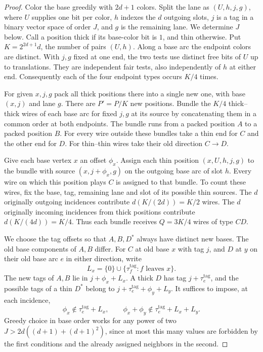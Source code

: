 \begin{proof}
Color the base greedily with $2d+1$ colors. Split the lane as $(U,h,j,g)$,
where $U$ supplies one bit per color, $h$ indexes the $d$ outgoing slots,
$j$ is a tag in a binary vector space of order $J$, and $g$ is the remaining
lane. We determine $J$ below. Call a position thick if its base-color bit
is $1$, and thin otherwise. Put $K=2^{2d+1}d$, the number of pairs $(U,h)$.
Along a base arc the endpoint colors are distinct. With $j,g$ fixed at one
end, the two tests use distinct free bits of $U$ up to translations. They
are independent fair tests, also independently of $h$ at either end.
Consequently each of the four endpoint types occurs $K/4$ times.

For given $x,j,g$ pack all thick positions there into a single new one, with
base $(x,j)$ and lane $g$. There are $P'=P/K$ new positions. Bundle the
$K/4$ thick--thick wires of each base arc for fixed $j,g$ at its source by
concatenating them in a common order at both endpoints. The bundle runs from
a packed position $A$ to a packed position $B$. For every wire outside these
bundles take a thin end for $C$ and the other end for $D$. For thin--thin
wires take their old direction $C\to D$.

Give each base vertex $x$ an offset $\phi_x$. Assign each thin position
$(x,U,h,j,g)$ to the bundle with source $(x,j+\phi_x,g)$ on the outgoing
base arc of slot $h$. Every wire on which this position plays $C$ is assigned
to that bundle. To count these wires, fix the base, tag, remaining lane and
slot of its possible thin sources. The $d$ originally outgoing incidences
contribute $d(K/(2d))=K/2$ wires. The $d$ originally incoming incidences
from thick positions contribute $d(K/(4d))=K/4$. Thus each bundle receives
$Q=3K/4$ wires of type $CD$.

We choose the tag offsets so that $A,B,D^*$ always have distinct new bases.
The old base components of $A,B$ differ. For $C$ at old base $x$ with tag
$j$, and $D$ at $y$ on their old base arc $e$ in either direction, write
\[
          L_x=\{0\}\cup\{\tau_f^{\mathrm{tag}}: f\text{ leaves }x\}.
\]
The new tags of $A,B$ lie in $j+\phi_x+L_x$. A thick $D$ has tag
$j+\tau_e^{\mathrm{tag}}$, and the possible tags of a thin $D^*$ belong to
$j+\tau_e^{\mathrm{tag}}+\phi_y+L_y$. It suffices to impose, at each
incidence,
\[
      \phi_x\notin\tau_e^{\mathrm{tag}}+L_x,
      \qquad \phi_x+\phi_y\notin\tau_e^{\mathrm{tag}}+L_x+L_y.
\]
Greedy choice in base order works for any power of two
$J>2d((d+1)+(d+1)^2)$, since at most this many values are forbidden by
the first conditions and the already assigned neighbors in the second.


\end{proof}
